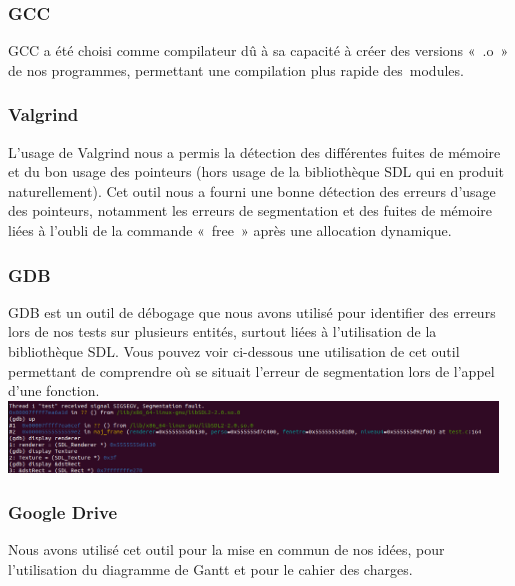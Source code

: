 \documentclass[12pt,a4paper]{article}
\begin{document}
            \subsubsection{GCC}
                \tabto{1cm} GCC a été choisi comme compilateur dû à sa capacité à créer des versions «~.o~» de nos programmes, permettant une compilation plus rapide des~modules.
            
            \subsubsection{Valgrind}
                \tabto{1cm} L’usage de Valgrind nous a permis la détection des différentes fuites de mémoire et du bon usage des pointeurs (hors usage de la bibliothèque SDL qui en produit naturellement). Cet outil nous a fourni une bonne détection des erreurs d’usage des pointeurs, notamment les erreurs de segmentation et des fuites de mémoire liées à l’oubli de la commande «~free~» après une allocation dynamique.
                
            \subsubsection{GDB}
                \tabto{1cm} GDB est un outil de débogage que nous avons utilisé pour identifier des erreurs lors de nos tests sur plusieurs entités, surtout liées à l’utilisation de la bibliothèque SDL. Vous pouvez voir ci-dessous une utilisation de cet outil permettant de comprendre où se situait l’erreur de segmentation lors de l’appel d’une fonction.\\

                \includegraphics[width=13cm]{images/debogage.png}\\
                
            \subsubsection{Google Drive}
                \tabto{1cm} Nous avons utilisé cet outil pour la mise en commun de nos idées, pour l’utilisation du diagramme de Gantt et pour le cahier des charges.
\end{document}
